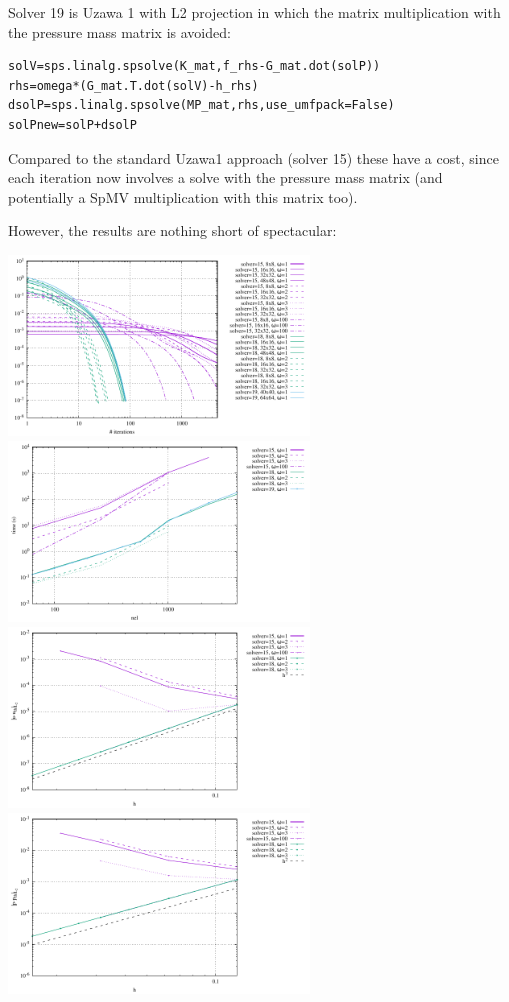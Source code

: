 Solver 19 is Uzawa 1 with L2 projection in which 
the matrix multiplication with the pressure mass matrix is avoided:
\begin{lstlisting}
solV=sps.linalg.spsolve(K_mat,f_rhs-G_mat.dot(solP))   
rhs=omega*(G_mat.T.dot(solV)-h_rhs)                     
dsolP=sps.linalg.spsolve(MP_mat,rhs,use_umfpack=False)   
solPnew=solP+dsolP                                    
\end{lstlisting}

Compared to the standard Uzawa1 approach (solver 15) these have a cost, 
since each iteration now involves a solve with the pressure mass matrix 
(and potentially a SpMV multiplication with this matrix too). 

However, the results are nothing short of spectacular:

\begin{center}
\includegraphics[width=8cm]{python_codes/fieldstone_147/RESULTS/L2/solver_convergence.pdf}
\includegraphics[width=8cm]{python_codes/fieldstone_147/RESULTS/L2/time.pdf}\\
\includegraphics[width=8cm]{python_codes/fieldstone_147/RESULTS/L2/errorsV.pdf}
\includegraphics[width=8cm]{python_codes/fieldstone_147/RESULTS/L2/errorsP.pdf}
\end{center}

